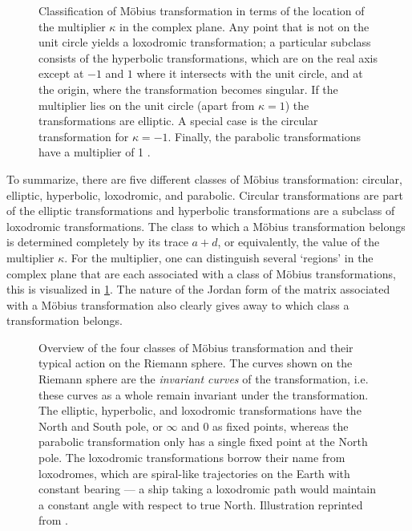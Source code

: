 \begin{figure}
    \centering
     
    \caption{Classification of Möbius transformation in terms of the location of the multiplier \(\kappa\) in the complex plane. Any point that is not on the unit circle yields a loxodromic transformation; a particular subclass consists of the hyperbolic transformations, which are on the real axis except at \(-1\) and \(1\) where it intersects with the unit circle, and at the origin, where the transformation becomes singular. If the multiplier lies on the unit circle (apart from $\kappa = 1$) the transformations are elliptic. A special case is the circular transformation for \(\kappa = -1\). Finally, the parabolic transformations have a multiplier of 1 \cite{Needham1997}.}
    \label{fig:multiplier_regions}
\end{figure}
To summarize, there are five different classes of Möbius transformation: circular, elliptic, hyperbolic, loxodromic, and parabolic. Circular transformations are part of the elliptic transformations and hyperbolic transformations are a subclass of loxodromic transformations. The class to which a Möbius transformation belongs is determined completely by its trace \(a + d\), or equivalently, the value of the multiplier \(\kappa\). For the multiplier, one can distinguish several `regions' in the complex plane that are each associated with a class of Möbius transformations, this is visualized in \cref{fig:multiplier_regions}. The nature of the Jordan form of the matrix associated with a Möbius transformation also clearly gives away to which class a transformation belongs. 
\begin{figure}
    \centering
    
    \caption{Overview of the four classes of Möbius transformation and their typical action on the Riemann sphere. The curves shown on the Riemann sphere are the \emph{invariant curves} of the transformation, i.e. these curves as a whole remain invariant under the transformation. The elliptic, hyperbolic, and loxodromic transformations have the North and South pole, or \(\infty\) and 0 as fixed points, whereas the parabolic transformation only has a single fixed point at the North pole. The loxodromic transformations borrow their name from loxodromes, which are spiral-like trajectories on the Earth with constant bearing --- a ship taking a loxodromic path would maintain a constant angle with respect to true North. Illustration reprinted from \citet[p. 78]{Needham2021}.}
    \label{fig:riemann_transformations}
\end{figure}

